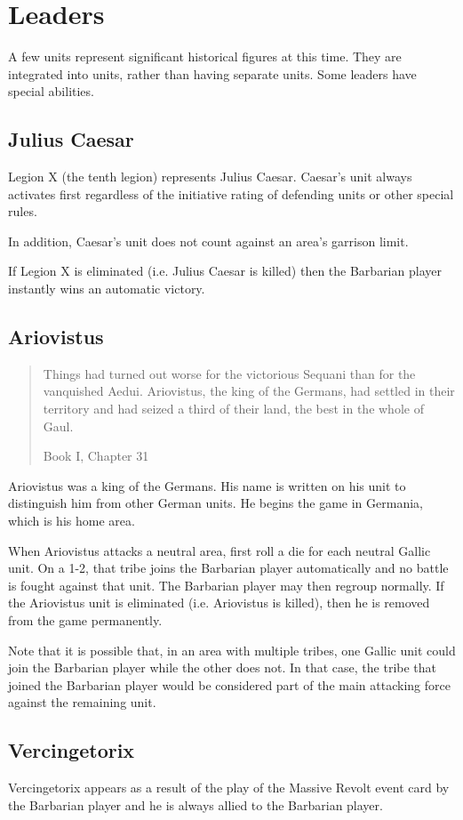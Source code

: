 \section{Leaders}
\par
A few units represent significant historical figures at this time. They are integrated into units, rather than having separate units. Some leaders have special abilities.

\subsection{Julius Caesar}
\par
Legion X (the tenth legion) represents Julius Caesar. Caesar’s unit always activates first regardless of the initiative rating of defending units or other special rules.

In addition, Caesar’s unit does not count against an area’s garrison limit.

If Legion X is eliminated (i.e. Julius Caesar is killed) then the Barbarian player instantly wins an automatic victory.

\subsection{Ariovistus}
\blockquote[Book I, Chapter 31]{Things had turned out worse for the victorious Sequani than for the vanquished Aedui. Ariovistus, the king of the Germans, had settled in their territory and had seized a third of their land, the best in the whole of Gaul.}
\par
Ariovistus was a king of the Germans. His name is written on his unit to distinguish him from other German units. He begins the game in Germania, which is his home area.

When Ariovistus attacks a neutral area, first roll a die for each neutral Gallic unit. On a 1-2, that tribe joins the Barbarian player automatically and no battle is fought against that unit. The Barbarian player may then regroup normally. If the Ariovistus unit is eliminated (i.e. Ariovistus is killed), then he is removed from the game permanently.

Note that it is possible that, in an area with multiple tribes, one Gallic unit could join the Barbarian player while the other does not. In that case, the tribe that joined the Barbarian player would be considered part of the main attacking force against the remaining unit.

\subsection{Vercingetorix}
\par
Vercingetorix appears as a result of the play of the Massive Revolt event card by the Barbarian player and he is always allied to the Barbarian player.


